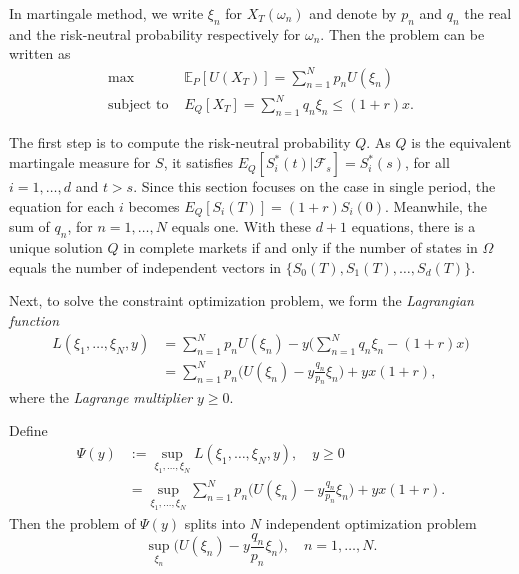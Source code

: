 \documentclass[a4paper]{article}
\theoremstyle{definition}
\numberwithin{equation}{section}
\begin{document}
In martingale method, we write $\xi_n$ for $X_T(\omega_n)$ and denote by $p_n$ and $q_n$ the real and the risk-neutral probability respectively for $\omega_n$. Then the problem can be written as
\begin{equation}\label{complete problem}
\begin{aligned}
\max\quad&\mathbb E_P[U(X_T)]=\sum^N_{n=1}p_nU(\xi_n)\\
\text{subject to }&E_ Q[X_T]=\sum^N_{n=1}q_n\xi_n\leq (1+r)x.
\end{aligned}
\end{equation}

The first step is to compute the risk-neutral probability $Q$. As $Q$ is the equivalent martingale measure for $S$, it satisfies $E_Q[S^*_i(t)\lvert\mathcal F_s]=S^*_i(s)$, for all $i=1,\dots,d$ and $t>s$. Since this section focuses on the case in single period, the equation for each $i$ becomes $E_Q[S_i(T)]=(1+r)S_i(0)$. Meanwhile, the sum of $q_n$, for $n=1,\dots,N$ equals one. With these $d+1$ equations, there is a unique solution $Q$ in complete markets if and only if the number of states in $\Omega$ equals the number of independent vectors in $\{S_0(T),S_1(T),\dots,S_d(T)\}$.

Next, to solve the constraint optimization problem, we form the \emph{Lagrangian function}
\begin{equation}\label{lag1}
\begin{aligned}
L(\xi_1,\dots,\xi_N,y)
&=\sum^N_{n=1}p_nU(\xi_n)-y\big(\sum^N_{n=1}q_n\xi_n-(1+r)x\big)\\
&=\sum^N_{n=1}p_n\big(U(\xi_n)-y\frac{q_n}{p_n}\xi_n\big)+yx(1+r),
\end{aligned}
\end{equation}
where the \emph{Lagrange multiplier} $y\geq0$.

Define
\begin{equation}\label{psi1}
\begin{aligned}
\Psi(y)
&:=\sup_{\xi_1,\dots,\xi_N}L(\xi_1,\dots,\xi_N,y),\quad y\geq 0\\
&=\sup_{\xi_1,\dots,\xi_N}\sum^N_{n=1}p_n\big(U(\xi_n)-y\frac{q_n}{p_n}\xi_n\big)+yx(1+r).
\end{aligned}
\end{equation}
Then the problem of $\Psi(y)$ splits into $N$ independent optimization problem
\begin{equation}\label{sub-problem-2.1}
\sup_{\xi_n}\big(U(\xi_n)-y\frac{q_n}{p_n}\xi_n\big),\quad n=1,\dots,N.
\end{equation}
\end{document}
